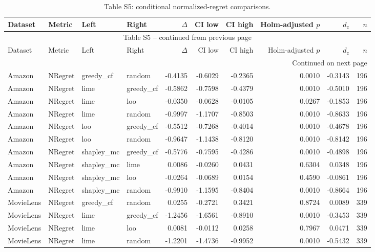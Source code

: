 \begin{longtable}{@{}p{}p{}p{}p{}rrrrrr@{}}
\caption{Table S5: conditional normalized-regret comparisons.}\label{tab:S5}\\
\toprule
Dataset & Metric & Left & Right & $\Delta$ & CI low & CI high & Holm-adjusted $p$ & $d_z$ & $n$ \\
\midrule
\endfirsthead
\multicolumn{10}{c}{Table S5 -- continued from previous page}\\
\toprule
Dataset & Metric & Left & Right & $\Delta$ & CI low & CI high & Holm-adjusted $p$ & $d_z$ & $n$ \\
\midrule
\endhead
\midrule
\multicolumn{10}{r}{Continued on next page}\\
\endfoot
\bottomrule
\endlastfoot
Amazon & NRegret & greedy\_cf & random & -0.4135 & -0.6029 & -0.2365 & 0.0010 & -0.3143 & 196 \\
Amazon & NRegret & lime & greedy\_cf & -0.5862 & -0.7598 & -0.4379 & 0.0010 & -0.5010 & 196 \\
Amazon & NRegret & lime & loo & -0.0350 & -0.0628 & -0.0105 & 0.0267 & -0.1853 & 196 \\
Amazon & NRegret & lime & random & -0.9997 & -1.1707 & -0.8503 & 0.0010 & -0.8633 & 196 \\
Amazon & NRegret & loo & greedy\_cf & -0.5512 & -0.7268 & -0.4014 & 0.0010 & -0.4678 & 196 \\
Amazon & NRegret & loo & random & -0.9647 & -1.1438 & -0.8120 & 0.0010 & -0.8142 & 196 \\
Amazon & NRegret & shapley\_mc & greedy\_cf & -0.5776 & -0.7595 & -0.4286 & 0.0010 & -0.4898 & 196 \\
Amazon & NRegret & shapley\_mc & lime & 0.0086 & -0.0260 & 0.0431 & 0.6304 & 0.0348 & 196 \\
Amazon & NRegret & shapley\_mc & loo & -0.0264 & -0.0689 & 0.0154 & 0.4590 & -0.0861 & 196 \\
Amazon & NRegret & shapley\_mc & random & -0.9910 & -1.1595 & -0.8404 & 0.0010 & -0.8664 & 196 \\
MovieLens & NRegret & greedy\_cf & random & 0.0255 & -0.2721 & 0.3421 & 0.8724 & 0.0089 & 339 \\
MovieLens & NRegret & lime & greedy\_cf & -1.2456 & -1.6561 & -0.8910 & 0.0010 & -0.3453 & 339 \\
MovieLens & NRegret & lime & loo & 0.0081 & -0.0112 & 0.0258 & 0.7967 & 0.0471 & 339 \\
MovieLens & NRegret & lime & random & -1.2201 & -1.4736 & -0.9952 & 0.0010 & -0.5432 & 339 \\

\end{longtable}
